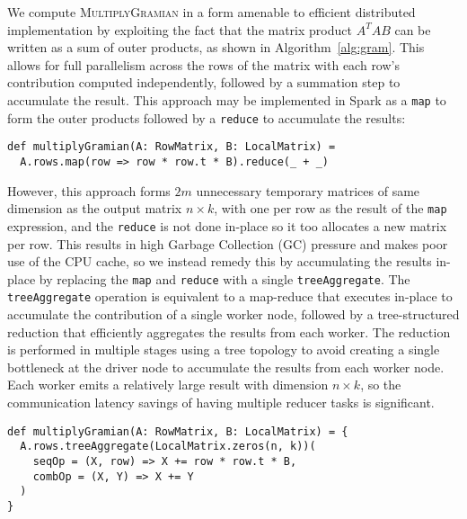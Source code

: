 We compute \textsc{MultiplyGramian} in a form amenable to efficient distributed implementation
by exploiting the fact that the matrix product $A^TAB$ can be written as a sum of outer products,
as shown in Algorithm~\ref{alg:gram}. This allows for full parallelism across the rows of the matrix with
each row's contribution computed independently, followed by a summation step to accumulate the result.
This approach may be implemented in Spark as a \texttt{map} to form the outer products followed by a \texttt{reduce}
to accumulate the results:
\begin{verbatim}
def multiplyGramian(A: RowMatrix, B: LocalMatrix) =
  A.rows.map(row => row * row.t * B).reduce(_ + _)
\end{verbatim}
However, this approach forms $2m$ unnecessary temporary matrices of same dimension as the output matrix $n\times k$,
with one per row as the result of the \texttt{map} expression, and the \texttt{reduce} is not done in-place so it
too allocates a new matrix per row.
This results in high Garbage Collection (GC) pressure and makes poor use of the CPU cache, so
we instead remedy this by accumulating the results in-place by replacing the \texttt{map}
and \texttt{reduce} with a single \texttt{treeAggregate}.
The \texttt{treeAggregate} operation is equivalent to a map-reduce that executes in-place to accumulate the contribution of a
single worker node, followed by a
tree-structured reduction that efficiently aggregates the results from each worker.
The reduction is performed in multiple stages using a tree topology to avoid creating a single
bottleneck at the driver node to accumulate the results from each worker node.
Each worker emits a relatively large result with dimension $n\times k$, so the
communication latency savings of having multiple reducer tasks is significant.
\begin{verbatim}
def multiplyGramian(A: RowMatrix, B: LocalMatrix) = {
  A.rows.treeAggregate(LocalMatrix.zeros(n, k))(
    seqOp = (X, row) => X += row * row.t * B,
    combOp = (X, Y) => X += Y
  )
}
\end{verbatim}

